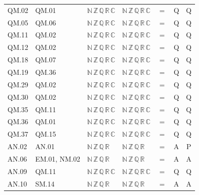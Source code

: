 {\begin{longtable}{l l l l c c c}
QM.02 & QM.01 & $\mathbb N\,\mathbb Z\,\mathbb Q\,\mathbb R\,\mathbb C$ & $\mathbb N\,\mathbb Z\,\mathbb Q\,\mathbb R\,\mathbb C$ & $=$ & Q & Q \\
QM.05 & QM.06 & $\mathbb N\,\mathbb Z\,\mathbb Q\,\mathbb R\,\mathbb C$ & $\mathbb N\,\mathbb Z\,\mathbb Q\,\mathbb R\,\mathbb C$ & $=$ & Q & Q \\
QM.11 & QM.02 & $\mathbb N\,\mathbb Z\,\mathbb Q\,\mathbb R\,\mathbb C$ & $\mathbb N\,\mathbb Z\,\mathbb Q\,\mathbb R\,\mathbb C$ & $=$ & Q & Q \\
QM.12 & QM.02 & $\mathbb N\,\mathbb Z\,\mathbb Q\,\mathbb R\,\mathbb C$ & $\mathbb N\,\mathbb Z\,\mathbb Q\,\mathbb R\,\mathbb C$ & $=$ & Q & Q \\
QM.18 & QM.07 & $\mathbb N\,\mathbb Z\,\mathbb Q\,\mathbb R\,\mathbb C$ & $\mathbb N\,\mathbb Z\,\mathbb Q\,\mathbb R\,\mathbb C$ & $=$ & Q & Q \\
QM.19 & QM.36 & $\mathbb N\,\mathbb Z\,\mathbb Q\,\mathbb R\,\mathbb C$ & $\mathbb N\,\mathbb Z\,\mathbb Q\,\mathbb R\,\mathbb C$ & $=$ & Q & Q \\
QM.29 & QM.02 & $\mathbb N\,\mathbb Z\,\mathbb Q\,\mathbb R\,\mathbb C$ & $\mathbb N\,\mathbb Z\,\mathbb Q\,\mathbb R\,\mathbb C$ & $=$ & Q & Q \\
QM.30 & QM.02 & $\mathbb N\,\mathbb Z\,\mathbb Q\,\mathbb R\,\mathbb C$ & $\mathbb N\,\mathbb Z\,\mathbb Q\,\mathbb R\,\mathbb C$ & $=$ & Q & Q \\
QM.35 & QM.11 & $\mathbb N\,\mathbb Z\,\mathbb Q\,\mathbb R\,\mathbb C$ & $\mathbb N\,\mathbb Z\,\mathbb Q\,\mathbb R\,\mathbb C$ & $=$ & Q & Q \\
QM.36 & QM.01 & $\mathbb N\,\mathbb Z\,\mathbb Q\,\mathbb R\,\mathbb C$ & $\mathbb N\,\mathbb Z\,\mathbb Q\,\mathbb R\,\mathbb C$ & $=$ & Q & Q \\
QM.37 & QM.15 & $\mathbb N\,\mathbb Z\,\mathbb Q\,\mathbb R\,\mathbb C$ & $\mathbb N\,\mathbb Z\,\mathbb Q\,\mathbb R\,\mathbb C$ & $=$ & Q & Q \\
AN.02 & AN.01 & $\mathbb N\,\mathbb Z\,\mathbb Q\,\mathbb R$ & $\mathbb N\,\mathbb Z\,\mathbb Q\,\mathbb R$ & $=$ & A & P \\
AN.06 & EM.01, NM.02 & $\mathbb N\,\mathbb Z\,\mathbb Q\,\mathbb R$ & $\mathbb N\,\mathbb Z\,\mathbb Q\,\mathbb R$ & $=$ & A & A \\
AN.09 & QM.11 & $\mathbb N\,\mathbb Z\,\mathbb Q\,\mathbb R\,\mathbb C$ & $\mathbb N\,\mathbb Z\,\mathbb Q\,\mathbb R\,\mathbb C$ & $=$ & Q & Q \\
AN.10 & SM.14 & $\mathbb N\,\mathbb Z\,\mathbb Q\,\mathbb R$ & $\mathbb N\,\mathbb Z\,\mathbb Q\,\mathbb R$ & $=$ & A & A \\

\end{longtable}}
